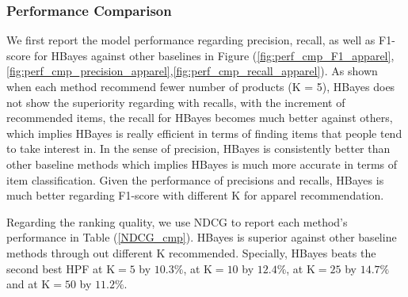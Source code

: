 \begin{table}[htb]
\begin{center}
\end{center}
\caption{NDCG on apparel recommendations}
\label{NDCG_cmp}
\end{table}

\subsubsection{Performance Comparison}
We first report the model performance regarding precision, recall, as well as F1-score for HBayes against other baselines in Figure (\ref{fig:perf_cmp_F1_apparel},\ref{fig:perf_cmp_precision_apparel},\ref{fig:perf_cmp_recall_apparel}).  As shown when each method recommend fewer number of products (K = 5), HBayes does not show the superiority regarding with recalls, with the increment of recommended items, the recall for HBayes becomes much better against others, which implies HBayes is really efficient in terms of finding items that people tend to take interest in.  In the sense of precision, HBayes is consistently better than other baseline methods which implies HBayes is much more accurate in terms of item classification.   Given the performance of precisions and recalls, HBayes is much better regarding F1-score with different K for apparel recommendation.

Regarding the ranking quality, we use NDCG to report each method's performance in Table (\ref{NDCG_cmp}).  HBayes is superior against other baseline methods through out different K recommended.  Specially, HBayes beats the second best HPF at $\text{K}=5$ by $10.3\%$, at $\text{K}=10$ by $12.4\%$, at $\text{K}=25$ by $14.7\%$ and at $\text{K}=50$ by $11.2\%$.  


